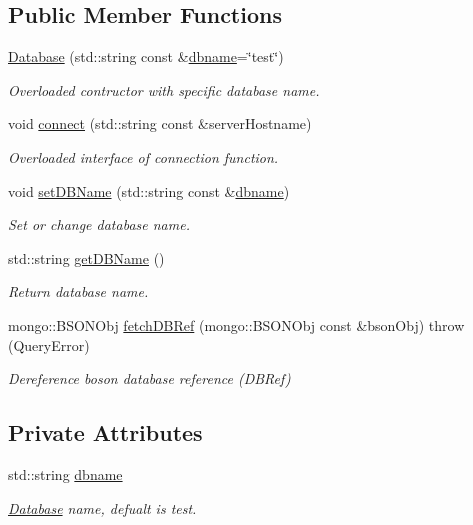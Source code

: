\subsection*{Public Member Functions}
\begin{DoxyCompactItemize}
\item 
\hyperlink{classunisys_1_1Database_a42a97889bb32435bb1ab8b84382a702d}{Database} (std\-::string const \&\hyperlink{classunisys_1_1Database_a0643effdb77f75a9f569a6c1a9aeaf90}{dbname}=\char`\"{}test\char`\"{})
\begin{DoxyCompactList}\small\item\em Overloaded contructor with specific database name. \end{DoxyCompactList}\item 
void \hyperlink{classunisys_1_1Database_a2df5d09f2fef6cb0ed002874fd4bee16}{connect} (std\-::string const \&server\-Hostname)
\begin{DoxyCompactList}\small\item\em Overloaded interface of connection function. \end{DoxyCompactList}\item 
void \hyperlink{classunisys_1_1Database_a842e22d2c0f68e9403ffb3e7d301a6fb}{set\-D\-B\-Name} (std\-::string const \&\hyperlink{classunisys_1_1Database_a0643effdb77f75a9f569a6c1a9aeaf90}{dbname})
\begin{DoxyCompactList}\small\item\em Set or change database name. \end{DoxyCompactList}\item 
std\-::string \hyperlink{classunisys_1_1Database_abf3f6aa38de47f1587163199d6aaae75}{get\-D\-B\-Name} ()
\begin{DoxyCompactList}\small\item\em Return database name. \end{DoxyCompactList}\item 
mongo\-::\-B\-S\-O\-N\-Obj \hyperlink{classunisys_1_1Database_ae87518cd37f1dddbc808e763ad1e9803}{fetch\-D\-B\-Ref} (mongo\-::\-B\-S\-O\-N\-Obj const \&bson\-Obj)  throw (\-Query\-Error)
\begin{DoxyCompactList}\small\item\em Dereference boson database reference (D\-B\-Ref) \end{DoxyCompactList}\end{DoxyCompactItemize}
\subsection*{Private Attributes}
\begin{DoxyCompactItemize}
\item 
std\-::string \hyperlink{classunisys_1_1Database_a0643effdb77f75a9f569a6c1a9aeaf90}{dbname}
\begin{DoxyCompactList}\small\item\em \hyperlink{classunisys_1_1Database}{Database} name, defualt is test. \end{DoxyCompactList}\end{DoxyCompactItemize}
